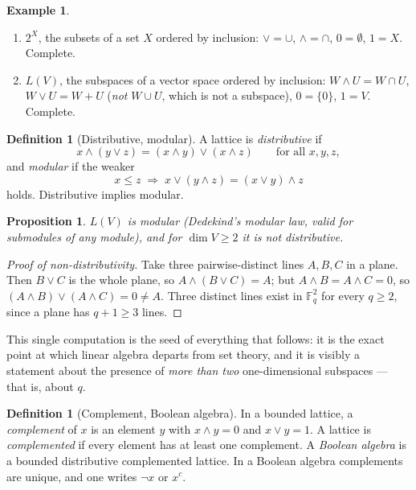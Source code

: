 \documentclass[11pt,a4paper]{article}
\newtheorem{proposition}[theorem]{Proposition}
\theoremstyle{definition}
\newtheorem{definition}[theorem]{Definition}
\newtheorem{example}[theorem]{Example}
\theoremstyle{remark}
\newcommand{\FF}{\mathbb{F}}
\begin{document}
\begin{example}\label{ex:lattices}
\begin{enumerate}[nosep,label=(\alph*)]
  \item $2^{X}$, the subsets of a set $X$ ordered by inclusion: $\vee = \cup$, $\wedge = \cap$,
        $0 = \emptyset$, $1 = X$. Complete.
  \item $L(V)$, the subspaces of a vector space ordered by inclusion:
        $W \wedge U = W \cap U$, $W \vee U = W + U$ (\emph{not} $W \cup U$, which is not a
        subspace), $0 = \{0\}$, $1 = V$. Complete.
\end{enumerate}
\end{example}

\begin{definition}[Distributive, modular]\label{def:distmod}
A lattice is \emph{distributive} if
\[
  x \wedge (y \vee z) = (x \wedge y) \vee (x \wedge z) \qquad \text{for all } x,y,z,
\]
and \emph{modular} if the weaker
\[
  x \leq z \;\Longrightarrow\; x \vee (y \wedge z) = (x \vee y) \wedge z
\]
holds. Distributive implies modular.
\end{definition}

\begin{proposition}\label{prop:modular}
$L(V)$ is modular (Dedekind's modular law, valid for submodules of any module), and for
$\dim V \geq 2$ it is \emph{not} distributive.
\end{proposition}

\begin{proof}[Proof of non-distributivity]
Take three pairwise-distinct lines $A, B, C$ in a plane. Then $B \vee C$ is the whole plane,
so $A \wedge (B \vee C) = A$; but $A \wedge B = A \wedge C = 0$, so
$(A \wedge B) \vee (A \wedge C) = 0 \neq A$. Three distinct lines exist in $\FF_q^{2}$ for
every $q \geq 2$, since a plane has $q+1 \geq 3$ lines.
\end{proof}

This single computation is the seed of everything that follows: it is the exact point at which
linear algebra departs from set theory, and it is visibly a statement about the presence of
\emph{more than two} one-dimensional subspaces --- that is, about $q$.

\begin{definition}[Complement, Boolean algebra]
In a bounded lattice, a \emph{complement} of $x$ is an element $y$ with $x \wedge y = 0$ and
$x \vee y = 1$. A lattice is \emph{complemented} if every element has at least one complement.
A \emph{Boolean algebra} is a bounded distributive complemented lattice. In a Boolean algebra
complements are unique, and one writes $\neg x$ or $x^{c}$.
\end{definition}
\end{document}
